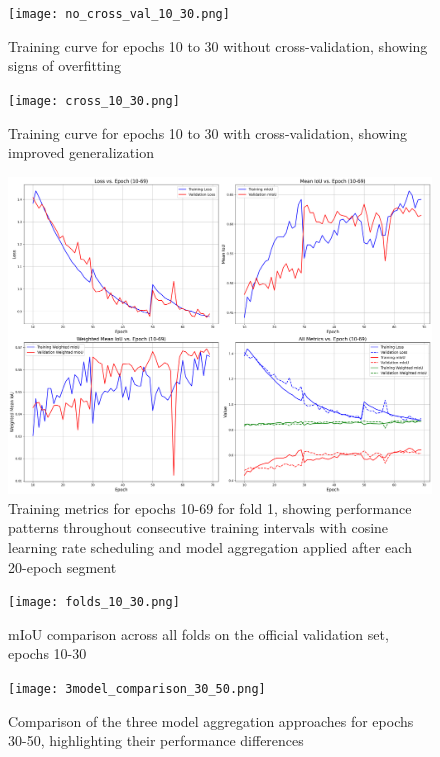 \documentclass[]{article}
\begin{document}
\begin{figure}[htbp]
		\centering
		\texttt{[image: no\_cross\_val\_10\_30.png]}
		\caption{Training curve for epochs 10 to 30 without cross-validation, showing signs of overfitting}
		\label{fig:no_cross_val_10_30}
\end{figure}

\begin{figure}[htbp]
		\centering
		\texttt{[image: cross\_10\_30.png]}
		\caption{Training curve for epochs 10 to 30 with cross-validation, showing improved generalization}
		\label{fig:cross_val_10_30}
\end{figure}

\begin{figure}[htbp]
		\centering
		\includegraphics[width=1.0\textwidth]{../outputs/deeplabv3plus_test_results/early_training_epochs_10_to_69.png}
		\caption{Training metrics for epochs 10-69 for fold 1, showing performance patterns throughout consecutive training intervals with cosine learning rate scheduling and model aggregation applied after each 20-epoch segment}
		\label{fig:train_metrics_10_69}
\end{figure}

\begin{figure}[htbp]
    \centering
    \texttt{[image: folds\_10\_30.png]}
    \caption{mIoU comparison across all folds on the official validation set, epochs 10-30}
    \label{fig:cross_val_10_30_val}
\end{figure}


\begin{figure}[htbp]
    \centering
    \texttt{[image: 3model\_comparison\_30\_50.png]}
    \caption{Comparison of the three model aggregation approaches for epochs 30-50, highlighting their performance differences}
    \label{fig:3model_comparison_30_50}
\end{figure}
\end{document}
